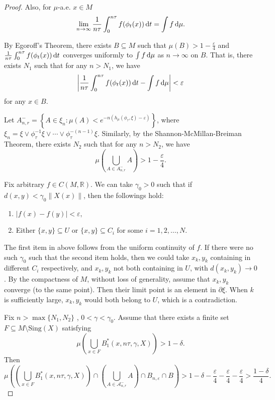 \documentclass[10pt]{article}
\newtheorem*{Theorem A}{Theorem A}
\begin{document}
\begin{proof}
Also, for \( \mu \)-a.e. \( x \in M \)
\[
\lim_{n \to \infty} \frac{1}{n\tau} \int_0^{n\tau} f(\phi_{ t}(x)) \, {\rm d}t= \int f \, {\rm d}\mu.
\]

\noindent
By Egoroff's Theorem, there exists \( B \subseteq M \) such that \( \mu(B) > 1 - \frac{\varepsilon}{4} \) and \( \frac{1}{n\tau} \int_0^{n\tau} f(\phi_{ t}(x)) \, {\rm d}t \) converges uniformly to \( \int f \, {\rm d}\mu \) as \( n \to \infty \) on \( B \). That is, there exists \( N_1 \) such that for any \( n > N_1 \), we have
\[
\left| \frac{1}{n\tau} \int_0^{n\tau} f(\phi_{ t}(x)) \,{\rm d} t - \int f \, {\rm d}\mu \right| < \varepsilon
\]
for any \( x \in B \).

Let \( A_{n, r}^- = \left\{ A \in  \xi_n : \mu(A) < e^{-n(h_\mu(\phi_\tau, \xi) - \varepsilon)} \right\} \), where \( \xi_n = \xi \vee \phi_{\tau}^{-1} \xi \vee \cdots \vee \phi_{\tau}^{-(n-1)} \xi \). Similarly, by the Shannon-McMillan-Breiman Theorem, there exists \( N_2 \) such that for any \( n > N_2 \), we have
\[
\mu\left( \bigcup_{A \in A^-_{n, r}} A \right) > 1 - \frac{\varepsilon}{4}.
\]

Fix arbitrary $f\in C(M, \mathbb{R})$. We can take \( \gamma_0 > 0 \) such that if \( d(x, y) < \gamma_0 \|X(x)\| \), then the followings hold:
\begin{enumerate}
\item[1.]
    \(
    |f(x) - f(y)| < \varepsilon,
    \)
\item[2.]
    Either  \( \{x, y\} \subseteq U \) or  \( \{x, y\} \subseteq C_i \) for some \( i = 1, 2, \ldots, N \).
\end{enumerate}

The first item in above follows from the uniform continuity of \( f \). If there were no such \( \gamma_0 \) such that the second item holds, then we could take \( x_k, y_k \) containing in different \( C_i \) respectively, and \( x_k, y_k \) not both containing in \( U \), with \( d(x_k, y_k) \to 0 \). By the compactness of $M$, without loss of generality, assume that \( x_k, y_k \) converge (to the same point). Then their limit point is an element in \( \partial{\xi} \). When \( k \) is sufficiently large, \( x_k, y_k \) would both belong to \( U \), which is a contradiction.

Fix \( n > \max\{N_1, N_2\} \) , \( 0 < \gamma < \gamma_0 \). Assume that there exists a finite set \( F \subseteq M \setminus \text{Sing}(X) \) satisfying
\[
\mu\left( \bigcup_{x \in F} B_1^*(x, n\tau, \gamma, X) \right) > 1 - \delta.
\]
Then
\[
\mu\left( \left( \bigcup_{x \in F} B_1^*(x, n\tau, \gamma, X) \right) \cap \left( \bigcup_{A \in \mathcal{A}^-_{n, r}} A \right) \cap B_{n, \varepsilon} \cap B \right) > 1 - \delta - \frac{\varepsilon}{4} - \frac{\varepsilon}{4} - \frac{\varepsilon}{4}> \frac{1 - \delta}{4}.
\]


\end{proof}
\end{document}
